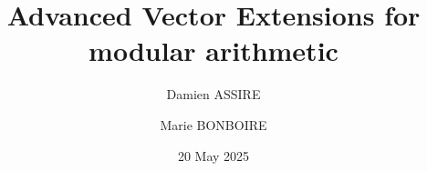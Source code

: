 \usepackage{graphicx} %
\usepackage{amssymb}
\usepackage{amsmath}
\usepackage{amsthm}
\usepackage{hyperref}
\usepackage{tikz} \usetikzlibrary{calc}
\usepackage{algpseudocode}
\usepackage{algorithm}




\beamertemplatenavigationsymbolsempty


\title[PCCA]{\textbf{Advanced Vector Extensions for modular arithmetic}}
\date{20 May 2025}
\author[D.ASSIRE, M.BONBOIRE]
{Damien ASSIRE \and Marie BONBOIRE}

